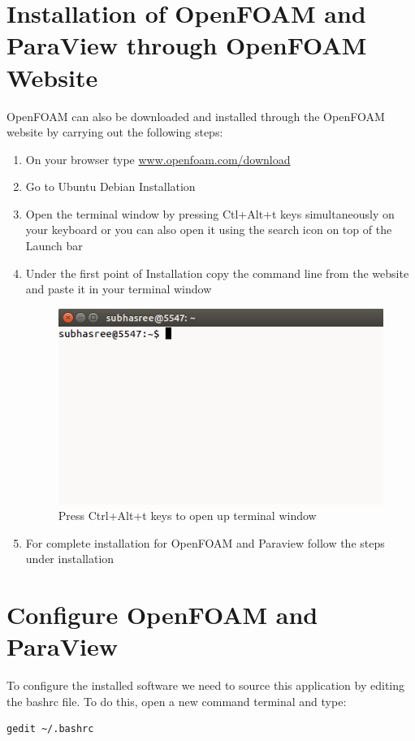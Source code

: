 \documentclass[a4paper,12pt]{report}
\begin{document}
\section{Installation of OpenFOAM and ParaView through OpenFOAM Website}
\flushleft OpenFOAM can also be downloaded and installed through the OpenFOAM website by carrying out the following steps:
\begin{enumerate}
  \item On your browser type \url{www.openfoam.com/download}
  \item Go to Ubuntu Debian Installation
  \item Open the terminal window by pressing Ctl+Alt+t keys simultaneously on your keyboard or you can also open it using the search icon on top of the Launch bar
  \item Under the first point of Installation copy the command line from the website and paste it in your terminal window

\begin{figure}[ht]  
\begin{center}  
\includegraphics[scale=0.5]{6.png}
\caption{Press Ctrl+Alt+t keys to open up terminal window}
\label{terminal}
\end{center}  
\end{figure}

 \item For complete installation for OpenFOAM and Paraview follow the steps under installation
 \end{enumerate}
 
 \section{Configure OpenFOAM and ParaView}
 \flushleft To configure the installed software we need to source this application by editing the bashrc file. To do this, open a new command terminal and type:
\begin{lstlisting}[frame=single]
gedit ~/.bashrc
\end{lstlisting}
\end{document}
